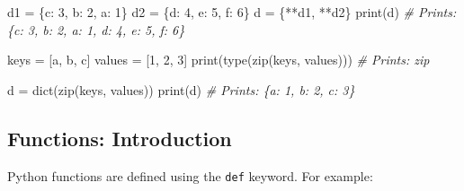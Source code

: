 \documentclass[
]{article}
\newenvironment{Shaded}{}{}
\newcommand{\BuiltInTok}[1]{#1}
\newcommand{\CommentTok}[1]{\textcolor[rgb]{0.38,0.63,0.69}{\textit{#1}}}
\newcommand{\DecValTok}[1]{\textcolor[rgb]{0.25,0.63,0.44}{#1}}
\newcommand{\NormalTok}[1]{#1}
\newcommand{\OperatorTok}[1]{\textcolor[rgb]{0.40,0.40,0.40}{#1}}
\newcommand{\StringTok}[1]{\textcolor[rgb]{0.25,0.44,0.63}{#1}}
\begin{document}
\begin{Shaded}
\begin{Highlighting}[]
\NormalTok{d1 }\OperatorTok{=}\NormalTok{ \{}\StringTok{\textquotesingle{}c\textquotesingle{}}\NormalTok{: }\DecValTok{3}\NormalTok{, }\StringTok{\textquotesingle{}b\textquotesingle{}}\NormalTok{: }\DecValTok{2}\NormalTok{, }\StringTok{\textquotesingle{}a\textquotesingle{}}\NormalTok{: }\DecValTok{1}\NormalTok{\}}
\NormalTok{d2 }\OperatorTok{=}\NormalTok{ \{}\StringTok{\textquotesingle{}d\textquotesingle{}}\NormalTok{: }\DecValTok{4}\NormalTok{, }\StringTok{\textquotesingle{}e\textquotesingle{}}\NormalTok{: }\DecValTok{5}\NormalTok{, }\StringTok{\textquotesingle{}f\textquotesingle{}}\NormalTok{: }\DecValTok{6}\NormalTok{\}}
\NormalTok{d }\OperatorTok{=}\NormalTok{ \{}\OperatorTok{**}\NormalTok{d1, }\OperatorTok{**}\NormalTok{d2\}}
\BuiltInTok{print}\NormalTok{(d)                 }
\CommentTok{\# Prints: \{\textquotesingle{}c\textquotesingle{}: 3, \textquotesingle{}b\textquotesingle{}: 2, \textquotesingle{}a\textquotesingle{}: 1, \textquotesingle{}d\textquotesingle{}: 4, \textquotesingle{}e\textquotesingle{}: 5, \textquotesingle{}f\textquotesingle{}: 6\}}

\NormalTok{keys }\OperatorTok{=}\NormalTok{ [}\StringTok{\textquotesingle{}a\textquotesingle{}}\NormalTok{, }\StringTok{\textquotesingle{}b\textquotesingle{}}\NormalTok{, }\StringTok{\textquotesingle{}c\textquotesingle{}}\NormalTok{]}
\NormalTok{values }\OperatorTok{=}\NormalTok{ [}\DecValTok{1}\NormalTok{, }\DecValTok{2}\NormalTok{, }\DecValTok{3}\NormalTok{]}
\BuiltInTok{print}\NormalTok{(}\BuiltInTok{type}\NormalTok{(}\BuiltInTok{zip}\NormalTok{(keys, values)))}
\CommentTok{\# Prints: zip}

\NormalTok{d }\OperatorTok{=} \BuiltInTok{dict}\NormalTok{(}\BuiltInTok{zip}\NormalTok{(keys, values))}
\BuiltInTok{print}\NormalTok{(d)}
\CommentTok{\# Prints: \{\textquotesingle{}a\textquotesingle{}: 1, \textquotesingle{}b\textquotesingle{}: 2, \textquotesingle{}c\textquotesingle{}: 3\}}
\end{Highlighting}
\end{Shaded}

\hypertarget{functions-introduction}{%
\subsection{Functions: Introduction}\label{functions-introduction}}

Python functions are defined using the \texttt{def} keyword. For
example:
\end{document}
